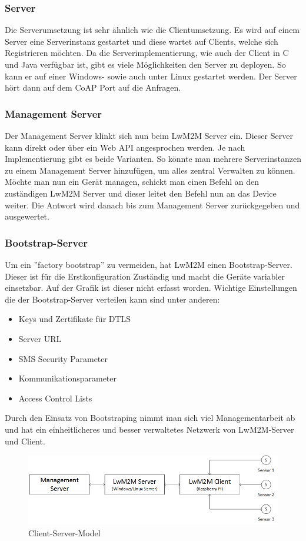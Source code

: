 \subsubsection{Server}
Die Serverumsetzung ist sehr ähnlich wie die Clientumsetzung. Es wird auf einem Server eine Serverinstanz gestartet und diese wartet auf Clients, welche sich Registrieren möchten. Da die Serverimplementierung, wie auch der Client in C und Java verfügbar ist, gibt es viele Möglichkeiten den Server zu deployen. So kann er auf einer Windows- sowie auch unter Linux gestartet werden. Der Server hört dann auf dem CoAP Port auf die Anfragen.
\subsubsection{Management Server}
Der Management Server klinkt sich nun beim LwM2M Server ein. Dieser Server kann direkt oder über ein Web API angesprochen werden. Je nach Implementierung gibt es beide Varianten. So könnte man mehrere Serverinstanzen zu einem Management Server hinzufügen, um alles zentral Verwalten zu können. Möchte man nun ein Gerät managen, schickt man einen Befehl an den zuständigen LwM2M Server und dieser leitet den Befehl nun an das Device weiter. Die Antwort wird danach bis zum Management Server zurückgegeben und ausgewertet. 
\subsubsection{Bootstrap-Server}
Um ein ''factory bootstrap'' zu vermeiden, hat LwM2M einen Bootstrap-Server. Dieser ist für die Erstkonfiguration Zuständig und macht die Geräte variabler einsetzbar. Auf der Grafik ist dieser nicht erfasst worden. Wichtige Einstellungen die der Bootstrap-Server verteilen kann sind unter anderen\cite{BootstrapFeatures}:
\begin{itemize}
\item Keys  und Zertifikate für DTLS
\item Server URL
\item SMS Security Parameter
\item Kommunikationsparameter
\item Access Control Lists
\end{itemize}
Durch den Einsatz von Bootstraping nimmt man sich viel Managementarbeit ab und hat ein einheitlicheres und besser verwaltetes Netzwerk von LwM2M-Server und Client.
\begin{figure}[H]
\includegraphics[scale=0.5]{images/lwm2m/server_client_model.png}
\caption{Client-Server-Model}
\end{figure}

